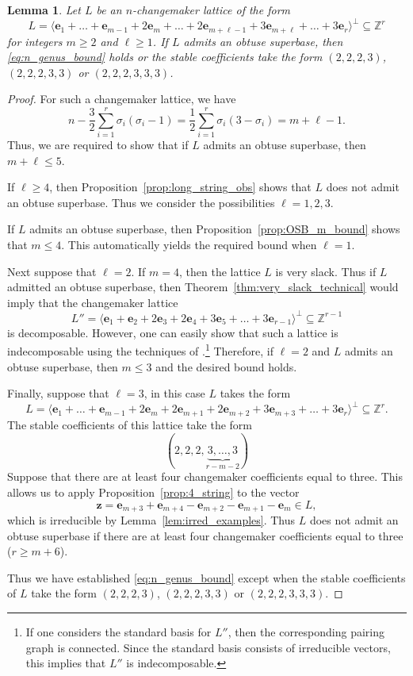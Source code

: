 \documentclass{amsart} %
\newcommand{\Z}{\mathbb{Z}}
\newcommand{\e}{\bm{e}}
\theoremstyle{thm}
\newtheorem{lem}[Theorem]{Lemma}
\theoremstyle{definition}
\numberwithin{equation}{section}
\begin{document}
\begin{lem}\label{lem:genus_bound_twos_and_threes}
Let $L$ be an $n$-changemaker lattice of the form
\[
L=\langle \e_1+ \dots+\e_{m-1} +2\e_m + \dots + 2\e_{m+\ell-1}+3\e_{m+\ell}+\dots + 3 \e_r\rangle^\bot\subseteq \Z^r
\]
for integers $m\geq 2$ and $\ell \geq 1$. If $L$ admits an obtuse superbase, then \eqref{eq:n_genus_bound} holds or the stable coefficients take the form $(2,2,2,3)$, $(2,2,2,3,3)$ or $(2,2,2,3,3,3)$. 
\end{lem}
\begin{proof}
For such a changemaker lattice, we have
\[n - \frac32\sum_{i=1}^r   \sigma_i(\sigma_i-1) = \frac12\sum_{i=1}^r \sigma_i(3-\sigma_i)=m+\ell -1.\]
Thus, we are required to show that if $L$ admits an obtuse superbase, then $m+\ell\leq 5$.

If $\ell \geq 4$, then Proposition~\ref{prop:long_string_obs} shows that $L$ does not admit an obtuse superbase. Thus we consider the possibilities $\ell=1,2,3$.

If $L$ admits an obtuse superbase, then Proposition~\ref{prop:OSB_m_bound} shows that $m\leq 4$. This automatically yields the required bound when $\ell=1$.

Next suppose that $\ell=2$. If $m=4$, then the lattice $L$ is very slack. Thus if $L$ admitted an obtuse superbase, then Theorem~\ref{thm:very_slack_technical} would imply that the changemaker lattice
\[L''=\langle \e_1+\e_{2} +2\e_3 + 2\e_{4}+3\e_{5}+\dots + 3 \e_{r-1}\rangle^\bot\subseteq \Z^{r-1}\]
is decomposable. However, one can easily show that such a lattice is indecomposable using the techniques of \cite[\S3.1]{GreeneLRP}.\footnote{If one considers the standard basis for $L''$, then the corresponding pairing graph is connected. Since the standard basis consists of irreducible vectors, this implies that $L''$ is indecomposable.} Therefore, if $\ell=2$ and $L$ admits an obtuse superbase, then $m\leq 3$ and the desired bound holds.

Finally, suppose that $\ell =3$, in this case $L$ takes the form
\[
L=\langle \e_1+ \dots+\e_{m-1} +2\e_m + 2\e_{m+1} + 2\e_{m+2}+3\e_{m+3}+\dots + 3 \e_r\rangle^\bot\subseteq \Z^r.
\]
The stable coefficients of this lattice take the form
\[
(2,2,2, \underbrace{3,\dots , 3}_{r-m-2})
\]
Suppose that there are at least four changemaker coefficients equal to three. This allows us to apply Proposition~\ref{prop:4_string} to the vector
\[
\bm{z}= \e_{m+3}+\e_{m+4}-\e_{m+2}-\e_{m+1}-\e_{m} \in L,
\]
which is irreducible by Lemma~\ref{lem:irred_examples}. Thus $L$ does not admit an obtuse superbase if there are at least four changemaker coefficients equal to three ($r\geq m+6$). 

Thus we have established \eqref{eq:n_genus_bound} except when the stable coefficients of $L$ take the form $(2,2,2,3)$, $(2,2,2,3,3)$ or $(2,2,2,3,3,3)$.
\end{proof}
\end{document}
